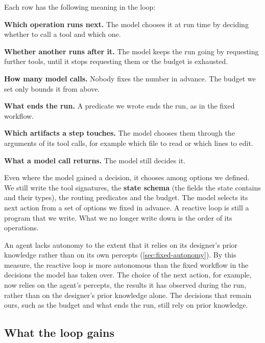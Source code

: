 Each row has the following meaning in the loop:
\bi
\item \textbf{Which operation runs next.} The model chooses it at run time by deciding whether to
call a tool and which one.
\item \textbf{Whether another runs after it.} The model keeps the run going by requesting further
tools, until it stops requesting them or the budget is exhausted.
\item \textbf{How many model calls.} Nobody fixes the number in advance. The budget we set only
bounds it from above.
\item \textbf{What ends the run.} A predicate we wrote ends the run, as in the fixed workflow.
\item \textbf{Which artifacts a step touches.} The model chooses them through the arguments of its
tool calls, for example which file to read or which lines to edit.
\item \textbf{What a model call returns.} The model still decides it.
\ei

Even where the model gained a decision, it chooses among options we defined. We still write the tool
signatures, the \textbf{state schema} (the fields the state contains and their types), the routing
predicates and the budget. The model selects its next action from a set of options we fixed in
advance. A reactive loop is still a program that we write. What we no longer write down is the order
of its operations.

An agent lacks autonomy to the extent that it relies on its designer's prior knowledge rather than
on its own percepts (\cref{sec:fixed-autonomy}). By this measure, the reactive loop is more
autonomous than the fixed workflow in the decisions the model has taken over. The choice of the next
action, for example, now relies on the agent's percepts, the results it has observed during the run,
rather than on the designer's prior knowledge alone. The decisions that remain ours, such as the
budget and what ends the run, still rely on prior knowledge.

\subsection{What the loop gains}
\label{sec:reactive-gains}

